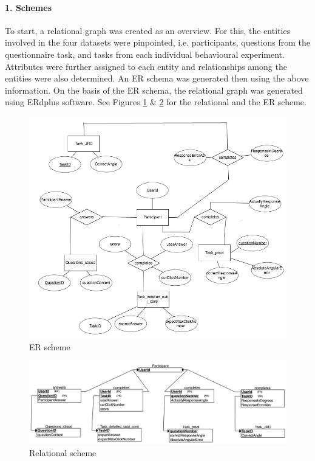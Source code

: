 \documentclass[11pt]{article}
\begin{document}
	\paragraph{1. Schemes}
		To start, a relational graph was created as an overview. For this, the entities involved in the four datasets were pinpointed, i.e. participants, questions from the questionnaire task, and tasks from each individual behavioural experiment. Attributes were further assigned to each entity and relationships among the entities were also determined. An ER schema was generated then using the above information. On the basis of the ER schema, the relational graph was generated using ERdplus software. See Figures \ref{fig:ER} \& \ref{fig:relational_schema} for the relational and the ER scheme.
		\begin{figure}[h] %
			\centering
			\includegraphics[width=\textwidth]{../organizational-figures/ER diagram_resized.png}
			\caption{ER scheme}
			\label{fig:ER}
		\end{figure}
		\begin{figure}[h] %
			\includegraphics[width=\textwidth]{../organizational-figures/Relational schema.png}
			\caption{Relational scheme}
			\label{fig:relational_schema}
		\end{figure}
\end{document}
